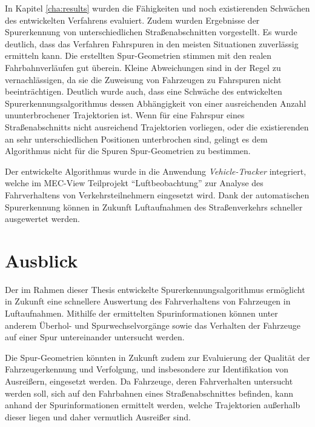 In Kapitel \ref{cha:results} wurden die Fähigkeiten und noch existierenden Schwächen des entwickelten
Verfahrens evaluiert. Zudem wurden Ergebnisse der Spurerkennung von unterschiedlichen Straßenabschnitten
vorgestellt. Es wurde deutlich, dass das Verfahren Fahrspuren in den meisten Situationen zuverlässig
ermitteln kann. Die erstellten Spur-Geometrien stimmen mit den realen Fahrbahnverläufen gut überein.
Kleine Abweichungen sind in der Regel zu vernachlässigen, da sie die Zuweisung von Fahrzeugen zu Fahrspuren
nicht beeinträchtigen.
Deutlich wurde auch, dass eine Schwäche des entwickelten Spurerkennungsalgorithmus
dessen Abhängigkeit von einer ausreichenden Anzahl ununterbrochener Trajektorien ist. Wenn für eine
Fahrspur eines Straßenabschnitts nicht ausreichend Trajektorien vorliegen, oder die existierenden an sehr
unterschiedlichen Positionen unterbrochen sind, gelingt es dem Algorithmus nicht für die Spuren
Spur-Geometrien zu bestimmen.

Der entwickelte Algorithmus wurde in die Anwendung \textit{Vehicle-Tracker} integriert,
welche im MEC-View Teilprojekt ``Luftbeobachtung'' zur Analyse des Fahrverhaltens von Verkehrsteilnehmern
eingesetzt wird. Dank der automatischen Spurerkennung können in Zukunft Luftaufnahmen des Straßenverkehrs
schneller ausgewertet werden.

\section{Ausblick}

Der im Rahmen dieser Thesis entwickelte Spurerkennungsalgorithmus ermöglicht in Zukunft eine schnellere Auswertung
des Fahrverhaltens von Fahrzeugen in Luftaufnahmen. Mithilfe der ermittelten Spurinformationen können
unter anderem Überhol- und Spurwechselvorgänge sowie das Verhalten der Fahrzeuge auf einer Spur
untereinander untersucht werden.

Die Spur-Geometrien könnten in Zukunft zudem zur Evaluierung der Qualität der Fahrzeugerkennung und Verfolgung,
und insbesondere zur Identifikation von Ausreißern, eingesetzt werden.
Da Fahrzeuge, deren Fahrverhalten untersucht werden soll, sich auf den Fahrbahnen eines Straßenabschnittes befinden,
kann anhand der Spurinformationen ermittelt werden, welche Trajektorien außerhalb dieser liegen und
daher vermutlich Ausreißer sind.


